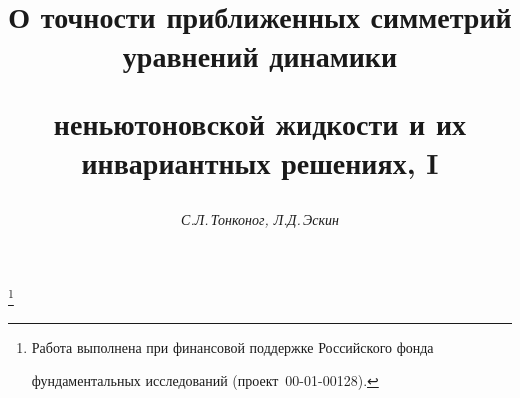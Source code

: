 

 




 


\newcommand{\const}{\operatorname{const}} 


\newcommand{\tts}[1]{} 


 




 


\setcounter{page}{53} 












 


\author{\it С.Л.\,Тонконог, Л.Д.\,Эскин} 




\title{О точности приближенных симметрий уравнений динамики 


неньютоновской жидкости и их инвариантных решениях, I} 


\thanks{Работа выполнена при финансовой поддержке Российского фонда 


фундаментальных исследований (проект \No\,00-01-00128).} 


 


\date{} 




\pagestyle{plain} %


 




